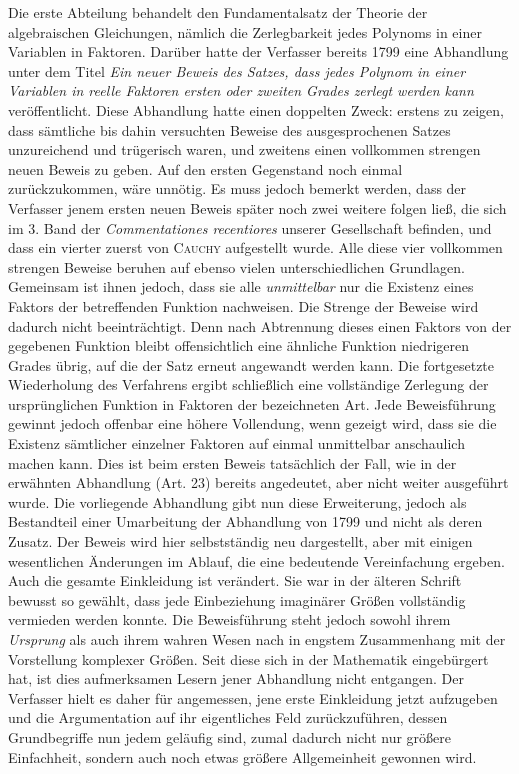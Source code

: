 Die erste Abteilung behandelt den Fundamentalsatz der Theorie der algebraischen Gleichungen, nämlich die Zerlegbarkeit jedes Polynoms in einer Variablen in Faktoren. Darüber hatte der Verfasser bereits 1799 eine Abhandlung unter dem Titel \textit{Ein neuer Beweis des Satzes, dass jedes Polynom} \textit{in einer Variablen in reelle Faktoren ersten oder zweiten Grades zerlegt werden kann} veröffentlicht. Diese Abhandlung hatte einen doppelten Zweck: erstens zu zeigen, dass sämtliche bis dahin versuchten Beweise des ausgesprochenen Satzes unzureichend und trügerisch waren, und zweitens einen vollkommen strengen neuen Beweis zu geben. Auf den ersten Gegenstand noch einmal zurückzukommen, wäre unnötig. Es muss jedoch bemerkt werden, dass der Verfasser jenem ersten neuen Beweis später noch zwei weitere folgen ließ, die sich im 3. Band
der \textit{Commentationes recentiores} unserer Gesellschaft befinden, und dass ein vierter zuerst von \textsc{Cauchy} aufgestellt wurde. Alle diese vier vollkommen strengen Beweise beruhen auf ebenso vielen unterschiedlichen Grundlagen. Gemeinsam ist ihnen jedoch, dass sie alle \textit{unmittelbar} nur die Existenz eines Faktors der betreffenden Funktion nachweisen. Die Strenge der Beweise wird dadurch nicht beeinträchtigt. Denn nach Abtrennung dieses einen Faktors von der gegebenen Funktion bleibt offensichtlich eine ähnliche Funktion niedrigeren Grades übrig, auf die der Satz erneut angewandt werden kann. Die fortgesetzte Wiederholung des Verfahrens ergibt schließlich eine vollständige Zerlegung der ursprünglichen Funktion in Faktoren der bezeichneten Art. Jede Beweisführung gewinnt jedoch offenbar eine höhere Vollendung, wenn gezeigt wird, dass sie die Existenz sämtlicher einzelner Faktoren auf einmal unmittelbar anschaulich machen kann. Dies ist beim ersten Beweis tatsächlich der Fall, wie in der erwähnten Abhandlung (Art. 23) bereits angedeutet, aber nicht weiter ausgeführt wurde. Die vorliegende Abhandlung gibt nun diese Erweiterung, jedoch als Bestandteil einer Umarbeitung der Abhandlung von 1799 und nicht als deren Zusatz. Der Beweis wird hier selbstständig neu dargestellt, aber mit einigen wesentlichen Änderungen im Ablauf, die eine bedeutende Vereinfachung ergeben. Auch die gesamte Einkleidung ist verändert. Sie war in der älteren Schrift bewusst so gewählt, dass jede Einbeziehung imaginärer Größen vollständig vermieden werden konnte. Die Beweisführung steht jedoch sowohl ihrem \textit{Ursprung} als auch ihrem wahren Wesen nach in engstem Zusammenhang mit der Vorstellung komplexer Größen. Seit diese sich in der Mathematik eingebürgert hat, ist dies aufmerksamen Lesern jener Abhandlung nicht entgangen. Der Verfasser hielt es daher für angemessen, jene erste Einkleidung jetzt aufzugeben und die Argumentation auf ihr eigentliches Feld zurückzuführen, dessen Grundbegriffe nun jedem geläufig sind, zumal dadurch nicht nur größere Einfachheit, sondern auch noch etwas größere Allgemeinheit gewonnen wird.

